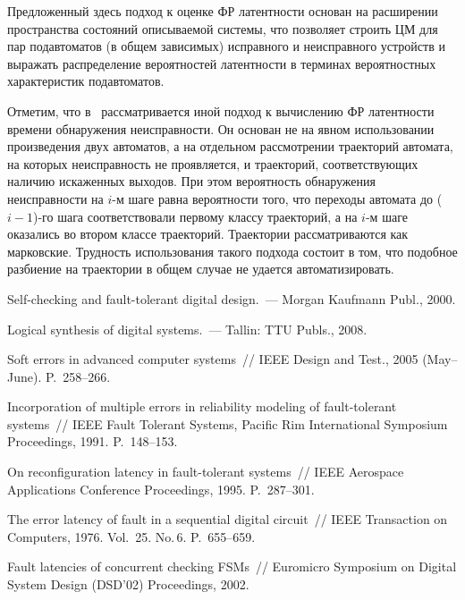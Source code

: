 \begin{multicols}{2}
 Предложенный здесь подход к оценке ФР латентности основан на
расширении пространства состояний описываемой системы, что позволяет строить
ЦМ для пар подавтоматов (в общем зависимых) исправного и неисправного
устройств и выражать распределение вероятностей латентности в терминах
вероятностных характеристик подавтоматов.

 Отметим, что в~\cite{7} рассматривается иной подход к вычислению ФР
латентности времени обнаружения неисправности.
Он основан не на явном использовании произведения двух автоматов, а на
отдельном рассмотрении траекторий автомата, на которых неисправность не
проявляется, и траекторий, соответствующих наличию искаженных выходов.
При этом вероятность обнаружения неисправности на $i$-м шаге равна
вероятности того, что переходы автомата до ($i-1$)-го шага соответствовали
первому классу траекторий, а на $i$-м шаге оказались во втором классе
траекторий.
Траектории рас\-смат\-ри\-ва\-ют\-ся как марковские.
Трудность использования такого подхода состоит в том, что подобное
разбиение на траектории в общем случае не удается автоматизировать.

\vspace*{-6pt}

{\small\frenchspacing
{\baselineskip=10.6pt
\begin{thebibliography}{99}
Self-checking and fault-tolerant digital design.~--- Morgan Kaufmann
Publ., 2000.

Logical synthesis of digital systems.~---
Tallin: TTU Publs., 2008.

Soft errors in advanced computer systems~//
IEEE Design and Test., 2005 (May--June). P.~258--266.

Incorporation of multiple errors in reliability modeling of fault-tolerant
systems~//
IEEE Fault Tolerant Systems, Pacific Rim International
Symposium Proceedings, 1991. P.~148--153.

On reconfiguration latency in fault-tolerant systems~//
IEEE Aerospace Applications Conference Proceedings, 1995. P.~287--301.


The error latency of fault in a sequential digital circuit~//
IEEE Transaction on Computers, 1976. Vol.~25. No.\,6. P.~655--659.

Fault latencies of concurrent checking FSMs~// Euromicro
Symposium on Digital System Design (DSD'02) Proceedings, 2002.


\end{thebibliography}}}
\end{multicols}
